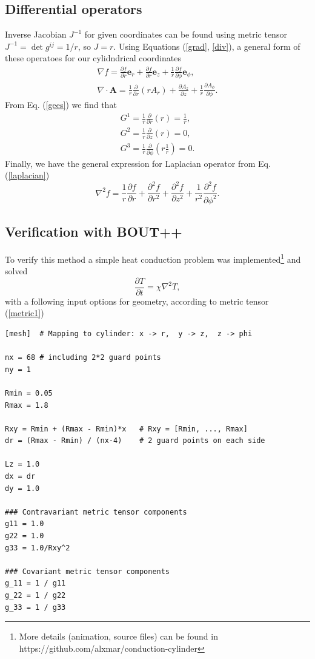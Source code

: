 \documentclass[11pt, oneside]{article}
\begin{document}
\subsection{Differential operators}
Inverse Jacobian $J^{-1}$ for given coordinates can be found using metric tensor $J^{-1} = \det{g^{ij}} = 1 / r$, so $J = r$.
Using Equations (\ref{grad}, \ref{div}), a general form of these operatoes for our cylidndrical coordinates
\begin{eqnarray}
\nabla f = \frac{\partial f}{\partial r}\mathbf{e}_r + \frac{\partial f}{\partial r}\mathbf{e}_z + \frac{1}{r} \frac{\partial f}{\partial \phi}\mathbf{e}_{\phi}, \label{grad1} \\
\nabla \cdot \mathbf{A} = \frac{1}{r} \frac{\partial}{\partial r} \left( r A_r \right) + \frac{\partial A_z}{\partial z}  + \frac{1}{r} \frac{\partial A_{\phi}}{\partial \phi}. \label{div1}
\end{eqnarray}
From Eq. (\ref{gees}) we find that
\begin{eqnarray*}
G^1 = \frac{1}{r} \frac{\partial}{\partial r} \left( r \right) = \frac{1}{r}, \\
G^2 = \frac{1}{r} \frac{\partial}{\partial z} \left( r \right) = 0, \\
G^3 = \frac{1}{r} \frac{\partial}{\partial \phi} \left( r \frac1{r} \right) = 0.
\end{eqnarray*}
Finally, we have the general expression for Laplacian operator from Eq.(\ref{laplacian})
\begin{equation}\label{laplacian1}
\nabla^2 f = \frac{1}{r}\frac{\partial f}{\partial r} + \frac{\partial^2 f}{\partial r^2} + \frac{\partial^2 f}{\partial z^2} + \frac{1}{r^2} \frac{\partial^2 f}{\partial \phi^2}.
\end{equation}

\subsection{Verification with BOUT++}
To verify this method a simple heat conduction problem was implemented\footnote{More details (animation, source files) can be found in https://github.com/alxmar/conduction-cylinder} and solved
\begin{equation}\label{conduction}
\frac{\partial T}{\partial t} = \chi \nabla^2 T,
\end{equation}
with a following input options for geometry, according to metric tensor (\ref{metric1})
\begin{lstlisting}
[mesh]  # Mapping to cylinder: x -> r,  y -> z,  z -> phi

nx = 68 # including 2*2 guard points
ny = 1

Rmin = 0.05
Rmax = 1.8

Rxy = Rmin + (Rmax - Rmin)*x   # Rxy = [Rmin, ..., Rmax]
dr = (Rmax - Rmin) / (nx-4)    # 2 guard points on each side

Lz = 1.0
dx = dr
dy = 1.0

### Contravariant metric tensor components
g11 = 1.0
g22 = 1.0
g33 = 1.0/Rxy^2

### Covariant metric tensor components
g_11 = 1 / g11
g_22 = 1 / g22
g_33 = 1 / g33
\end{lstlisting}
\end{document}
